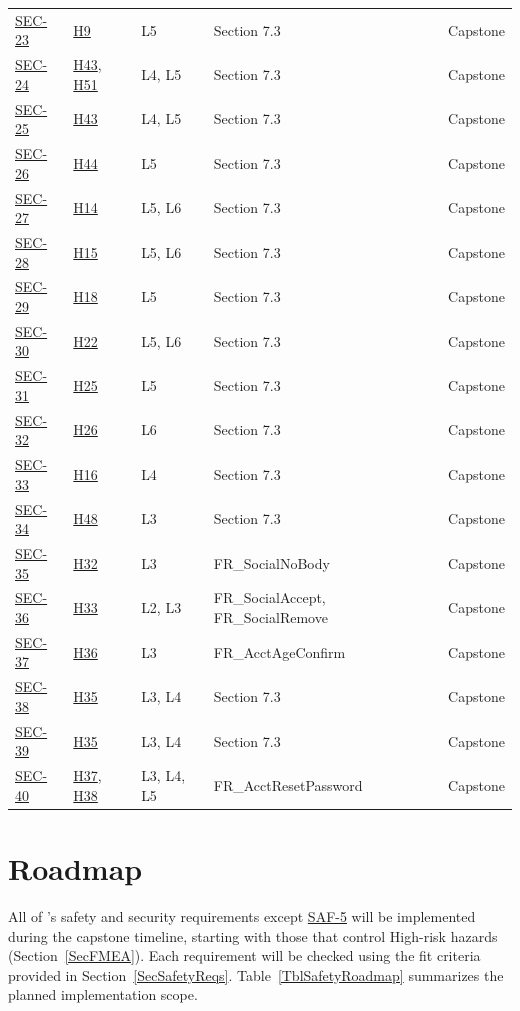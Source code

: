 \documentclass{article}
\newcommand{\reqref}[1]{\hyperref[req:#1]{#1}}
\newcommand{\hazref}[1]{\hyperref[#1]{#1}}
\begin{document}
{\begin{longtable}{>{\raggedright\arraybackslash}p{}>{\raggedright\arraybackslash}p{}>{\raggedright\arraybackslash}p{}>{\raggedright\arraybackslash}p{}l}
\reqref{SEC-23} & \hazref{H9} & L5 & Section 7.3 & Capstone\\
\reqref{SEC-24} & \hazref{H43}, \hazref{H51} & L4, L5 & Section 7.3 & Capstone\\
\reqref{SEC-25} & \hazref{H43} & L4, L5 & Section 7.3 & Capstone\\
\reqref{SEC-26} & \hazref{H44} & L5 & Section 7.3 & Capstone\\
\reqref{SEC-27} & \hazref{H14} & L5, L6 & Section 7.3 & Capstone\\
\reqref{SEC-28} & \hazref{H15} & L5, L6 & Section 7.3 & Capstone\\
\reqref{SEC-29} & \hazref{H18} & L5 & Section 7.3 & Capstone\\
\reqref{SEC-30} & \hazref{H22} & L5, L6 & Section 7.3 & Capstone\\
\reqref{SEC-31} & \hazref{H25} & L5 & Section 7.3 & Capstone\\
\reqref{SEC-32} & \hazref{H26} & L6 & Section 7.3 & Capstone\\
\reqref{SEC-33} & \hazref{H16} & L4 & Section 7.3 & Capstone\\
\reqref{SEC-34} & \hazref{H48} & L3 & Section 7.3 & Capstone\\
\reqref{SEC-35} & \hazref{H32} & L3 & FR\_SocialNoBody & Capstone\\
\reqref{SEC-36} & \hazref{H33} & L2, L3 & FR\_SocialAccept, FR\_SocialRemove & Capstone\\
\reqref{SEC-37} & \hazref{H36} & L3 & FR\_AcctAgeConfirm & Capstone\\
\reqref{SEC-38} & \hazref{H35} & L3, L4 & Section 7.3 & Capstone\\
\reqref{SEC-39} & \hazref{H35} & L3, L4 & Section 7.3 & Capstone\\
\reqref{SEC-40} & \hazref{H37}, \hazref{H38} & L3, L4, L5 & FR\_AcctResetPassword & Capstone\\
\end{longtable}
}

\clearpage

\fussy
\section{Roadmap} \label{SecRoadmap}

All of \progname{}'s safety and security requirements except \reqref{SAF-5}
will be implemented during the capstone timeline, starting with those that
control High-risk hazards (Section~\ref{SecFMEA}). Each requirement will be
checked using the fit criteria provided in Section~\ref{SecSafetyReqs}.
Table~\ref{TblSafetyRoadmap} summarizes the planned implementation scope.
\end{document}

